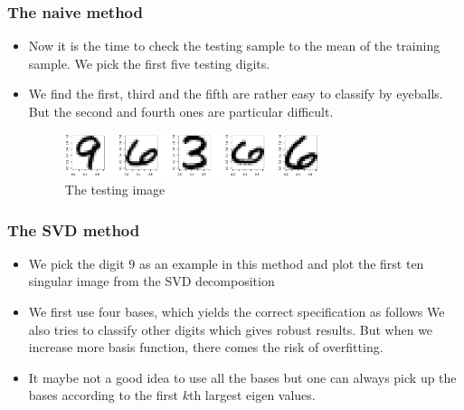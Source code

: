 \documentclass[10pt]{beamer}
\begin{document}
\begin{frame}
\frametitle{The naive method}

\begin{itemize}
\item Now it is the time to check the testing sample to the mean of the training
sample. We pick the first five testing digits.

\item  We find the first, third and the fifth are rather
easy to classify by eyeballs. But the second and fourth ones are particular
difficult.
\begin{figure}
  \centering
  \includegraphics[width=0.7\textwidth]{test5}
  \caption{The testing image}
  \label{fig:test5}
\end{figure}

\end{itemize}
\end{frame}



\begin{frame}
\frametitle{The SVD method}

\begin{itemize}
\item We pick the digit $9$ as an example in this method and plot the first ten
singular image from the SVD decomposition

\item We first use four bases, which yields the correct specification as
  follows We also tries to classify other digits which gives robust
  results. But when we increase more basis function, there comes the risk of
  overfitting.

\item It maybe not a good idea to use all the bases but one can always pick up
  the bases according to the first $k$th largest eigen values.

\end{itemize}

\end{frame}
\end{document}
